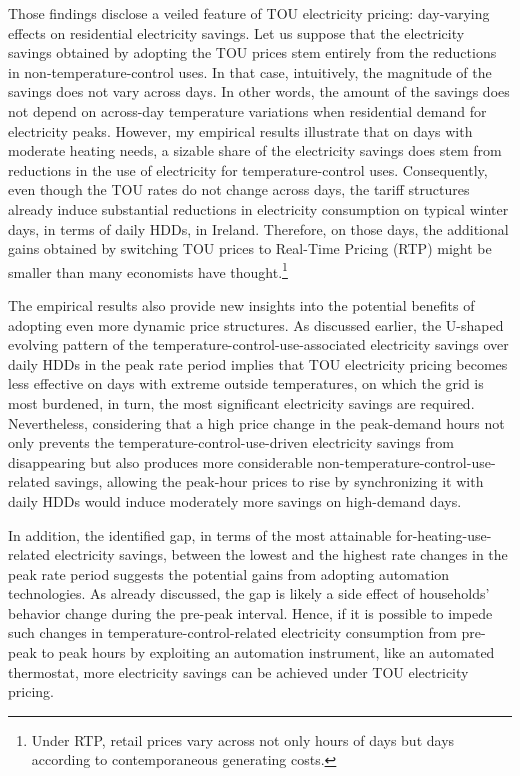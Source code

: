 Those findings disclose a veiled feature of TOU electricity pricing: day-varying effects on residential electricity savings. Let us suppose that the electricity savings obtained by adopting the TOU prices stem entirely from the reductions in non-temperature-control uses. In that case, intuitively, the magnitude of the savings does not vary across days. In other words, the amount of the savings does not depend on across-day temperature variations when residential demand for electricity peaks. However, my empirical results illustrate that on days with moderate heating needs, a sizable share of the electricity savings does stem from reductions in the use of electricity for temperature-control uses. Consequently, even though the TOU rates do not change across days, the tariff structures already induce substantial reductions in electricity consumption on typical winter days, in terms of daily HDDs, in Ireland. Therefore, on those days, the additional gains obtained by switching TOU prices to Real-Time Pricing (RTP) might be smaller than many economists have thought.\footnote{Under RTP, retail prices vary across not only hours of days but days according to contemporaneous generating costs.} 

The empirical results also provide new insights into the potential benefits of adopting even more dynamic price structures. As discussed earlier, the U-shaped evolving pattern of the temperature-control-use-associated electricity savings over daily HDDs in the peak rate period implies that TOU electricity pricing becomes less effective on days with extreme outside temperatures, on which the grid is most burdened, in turn, the most significant electricity savings are required. Nevertheless, considering that a high price change in the peak-demand hours not only prevents the temperature-control-use-driven electricity savings from disappearing but also produces more considerable non-temperature-control-use-related savings, allowing the peak-hour prices to rise by synchronizing it with daily HDDs would induce moderately more savings on high-demand days.

In addition, the identified gap, in terms of the most attainable for-heating-use-related electricity savings, between the lowest and the highest rate changes in the peak rate period suggests the potential gains from adopting automation technologies. As already discussed, the gap is likely a side effect of households' behavior change during the pre-peak interval. Hence, if it is possible to impede such changes in temperature-control-related electricity consumption from pre-peak to peak hours by exploiting an automation instrument, like an automated thermostat, more electricity savings can be achieved under TOU electricity pricing. 

